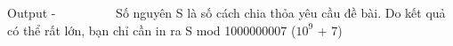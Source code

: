 Output
-          Số nguyên S là số cách chia thỏa yêu cầu đề bài. Do kết quả có thể rất lớn, bạn chỉ cần in ra S mod 1000000007 ($10^{9}$   + 7)